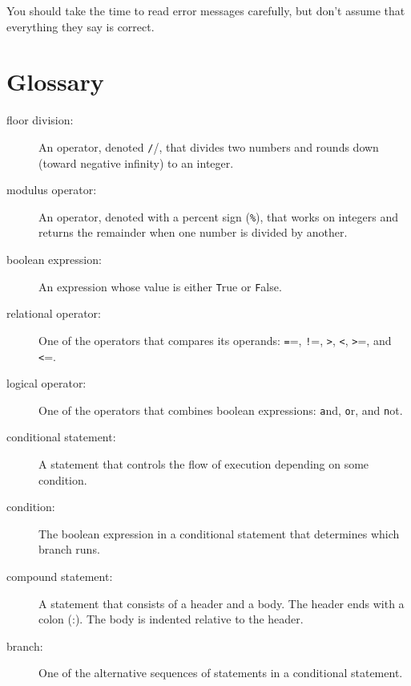 \documentclass[
DIV=11,
fontsize=12,
twoside,
headinclude=false,
titlepage=firstiscover,
abstract=true,
headsepline=true,
footsepline=true,
chapterprefix=true, %
headings=big,
bibliography=totoc,%
captions=tableheading
]{scrbook}
\theoremstyle{definition}
\begin{document}
You should take the time to read error messages carefully, but don't
assume that everything they say is correct.


\section{Glossary}

\begin{description}

\item[floor division:] An operator, denoted {\texttt //}, that divides two
  numbers and rounds down (toward negative infinity) to an integer.

\item[modulus operator:]  An operator, denoted with a percent sign
({\texttt \%}), that works on integers and returns the remainder when one
number is divided by another.

\item[boolean expression:]  An expression whose value is either 
{\texttt True} or {\texttt False}.

\item[relational operator:] One of the operators that compares
its operands: {\texttt ==}, {\texttt !=}, {\texttt >}, {\texttt <}, {\texttt >=}, and {\texttt <=}.

\item[logical operator:] One of the operators that combines boolean
expressions: {\texttt and}, {\texttt or}, and {\texttt not}.

\item[conditional statement:]  A statement that controls the flow of
execution depending on some condition.

\item[condition:] The boolean expression in a conditional statement
that determines which branch runs.

\item[compound statement:]  A statement that consists of a header
and a body.  The header ends with a colon (:).  The body is indented
relative to the header.

\item[branch:] One of the alternative sequences of statements in
a conditional statement.


\end{description}
\end{document}
